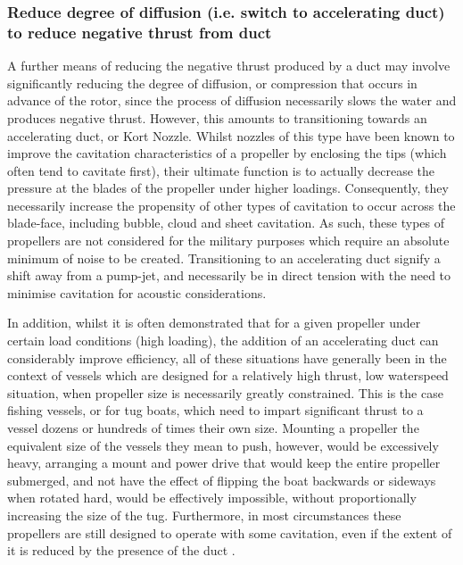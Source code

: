 \documentclass{article}\usepackage[]{graphicx}\usepackage[]{color}
\begin{document}
\subsubsection{Reduce degree of diffusion (i.e. switch to accelerating duct) to reduce negative thrust from duct}
A further means of reducing the negative thrust produced by a duct may involve significantly reducing the degree of diffusion, or compression that occurs in advance of the rotor, since the process of diffusion necessarily slows the water and produces negative thrust.  However, this amounts to transitioning towards an accelerating duct, or Kort Nozzle. Whilst nozzles of this type have been known to improve the cavitation characteristics of a propeller by enclosing the tips (which often tend to cavitate first), their ultimate function is to actually decrease the pressure at the blades of the propeller under higher loadings.  Consequently, they necessarily increase the propensity of other types of cavitation to occur across the blade-face, including bubble, cloud and sheet cavitation. As such, these types of propellers are not considered for the military purposes which require an absolute minimum of noise to be created.  Transitioning to an accelerating duct signify a shift away from a pump-jet, and necessarily be in direct tension with the need to minimise cavitation for acoustic considerations.

In addition, whilst it is often demonstrated that for a given propeller under certain load conditions (high loading), the addition of an accelerating duct can considerably improve efficiency, all of these situations have generally been in the context of vessels which are designed for a relatively high thrust, low waterspeed situation, when propeller size is necessarily greatly constrained.  This is the case fishing vessels, or for tug boats, which need to impart significant thrust to a vessel dozens or hundreds of times their own size.  Mounting a propeller the equivalent size of the vessels they mean to push, however, would be excessively heavy, arranging a mount and power drive that would keep the entire propeller submerged, and not have the effect of flipping the boat backwards or sideways when rotated hard, would be effectively impossible, without proportionally increasing the size of the tug. Furthermore, in most circumstances these propellers are still designed to operate with some cavitation, even if the extent of it is reduced by the presence of the duct \parencite{haimov2010}.
\end{document}
